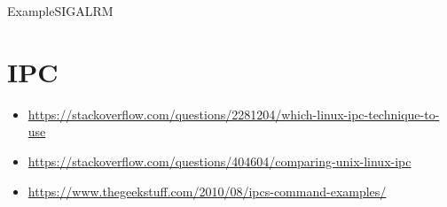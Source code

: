 \begin{frame}{Example}{SIGALRM}
  \begin{minipage}{.45\linewidth}
  \end{minipage}\quad
  \begin{minipage}{.45\linewidth}
  \end{minipage}
\end{frame}

\section{IPC}
\label{sec:ipc}

\begin{itemize}
\item \url{https://stackoverflow.com/questions/2281204/which-linux-ipc-technique-to-use}
\item \url{https://stackoverflow.com/questions/404604/comparing-unix-linux-ipc}
\item \url{https://www.thegeekstuff.com/2010/08/ipcs-command-examples/}
\end{itemize}

